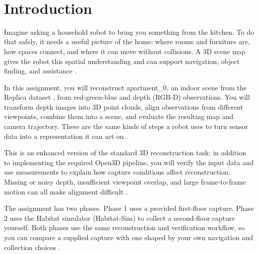 \documentclass[11pt]{article}
\title{\textbf{\AssignmentTitle}}
\author{
    \InstructorName\\
    \InstructorEmail
}
\date{\Semester}
\newif\iftutornotes
\newcommand{\EditionLabel}{%
    \iftutornotes
        \begin{center}
            {\small\color{tutorblue}
            TA / Tutor Teaching Edition}
        \end{center}
        \vspace{0.5em}
    \fi
}
\begin{document}
\maketitle
\EditionLabel

\section{Introduction}
Imagine asking a household robot to bring you something from the kitchen. To do that safely, it needs a useful picture of the home: where rooms and furniture are, how spaces connect, and where it can move without collisions. A 3D scene map gives the robot this spatial understanding and can support navigation, object finding, and assistance \cite{szeliski2022computer,replica2019}.

In this assignment, you will reconstruct apartment\_0, an indoor scene from the Replica dataset \cite{replica2019}, from red-green-blue and depth (RGB-D) observations. You will transform depth images into 3D point clouds, align observations from different viewpoints, combine them into a scene, and evaluate the resulting map and camera trajectory. These are the same kinds of steps a robot uses to turn sensor data into a representation it can act on \cite{hartley2004multiple,chen1992object}.

This is an enhanced version of the standard 3D reconstruction task: in addition to implementing the required Open3D pipeline, you will verify the input data and use measurements to explain how capture conditions affect reconstruction. Missing or noisy depth, insufficient viewpoint overlap, and large frame-to-frame motion can all make alignment difficult \cite{shin2019camera,immerkaer1996fast}.

The assignment has two phases. Phase 1 uses a provided first-floor capture. Phase 2 uses the Habitat simulator (Habitat-Sim) to collect a second-floor capture yourself. Both phases use the same reconstruction and verification workflow, so you can compare a supplied capture with one shaped by your own navigation and collection choices \cite{replica2019,habitatsim2020}.

\end{document}
